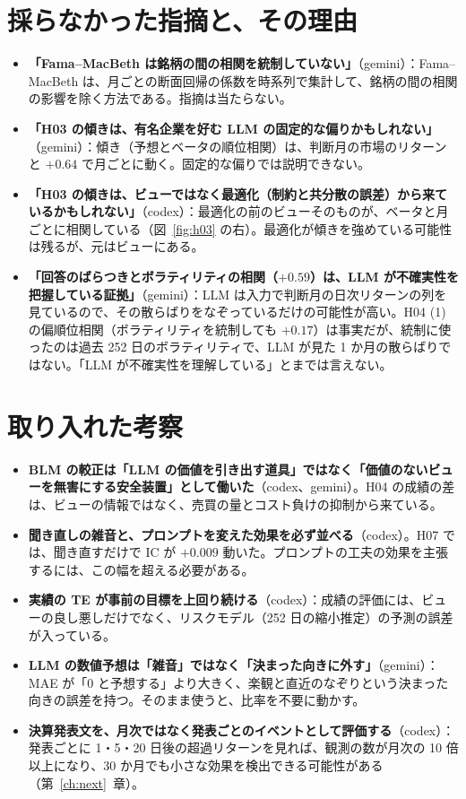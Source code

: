 \documentclass[xelatex,ja=standard,jafont=haranoaji,a4paper,10pt,openany]{bxjsreport}
\newcommand{\figref}[1]{図~\ref{#1}}
\newcommand{\chapref}[1]{第~\ref{#1}~章}
\begin{document}
\section{採らなかった指摘と、その理由}

\begin{itemize}
\item \textbf{「Fama--MacBeth は銘柄の間の相関を統制していない」}（gemini）：Fama--MacBeth は、月ごとの断面回帰の係数を時系列で集計して、銘柄の間の相関の影響を除く方法である。指摘は当たらない。
\item \textbf{「H03 の傾きは、有名企業を好む LLM の固定的な偏りかもしれない」}（gemini）：傾き（予想とベータの順位相関）は、判断月の市場のリターンと $+0.64$ で月ごとに動く。固定的な偏りでは説明できない。
\item \textbf{「H03 の傾きは、ビューではなく最適化（制約と共分散の誤差）から来ているかもしれない」}（codex）：最適化の前のビューそのものが、ベータと月ごとに相関している（\figref{fig:h03} の右）。最適化が傾きを強めている可能性は残るが、元はビューにある。
\item \textbf{「回答のばらつきとボラティリティの相関（$+0.59$）は、LLM が不確実性を把握している証拠」}（gemini）：LLM は入力で判断月の日次リターンの列を見ているので、その散らばりをなぞっているだけの可能性が高い。H04 (1) の偏順位相関（ボラティリティを統制しても $+0.17$）は事実だが、統制に使ったのは過去 252 日のボラティリティで、LLM が見た 1 か月の散らばりではない。「LLM が不確実性を理解している」とまでは言えない。
\end{itemize}

\section{取り入れた考察}

\begin{itemize}
\item \textbf{BLM の較正は「LLM の価値を引き出す道具」ではなく「価値のないビューを無害にする安全装置」として働いた}（codex、gemini）。H04 の成績の差は、ビューの情報ではなく、売買の量とコスト負けの抑制から来ている。
\item \textbf{聞き直しの雑音と、プロンプトを変えた効果を必ず並べる}（codex）。H07 では、聞き直すだけで IC が $+0.009$ 動いた。プロンプトの工夫の効果を主張するには、この幅を超える必要がある。
\item \textbf{実績の TE が事前の目標を上回り続ける}（codex）：成績の評価には、ビューの良し悪しだけでなく、リスクモデル（252 日の縮小推定）の予測の誤差が入っている。
\item \textbf{LLM の数値予想は「雑音」ではなく「決まった向きに外す」}（gemini）：MAE が「0 と予想する」より大きく、楽観と直近のなぞりという決まった向きの誤差を持つ。そのまま使うと、比率を不要に動かす。
\item \textbf{決算発表文を、月次ではなく発表ごとのイベントとして評価する}（codex）：発表ごとに 1・5・20 日後の超過リターンを見れば、観測の数が月次の 10 倍以上になり、30 か月でも小さな効果を検出できる可能性がある（\chapref{ch:next}）。
\end{itemize}
\end{document}
